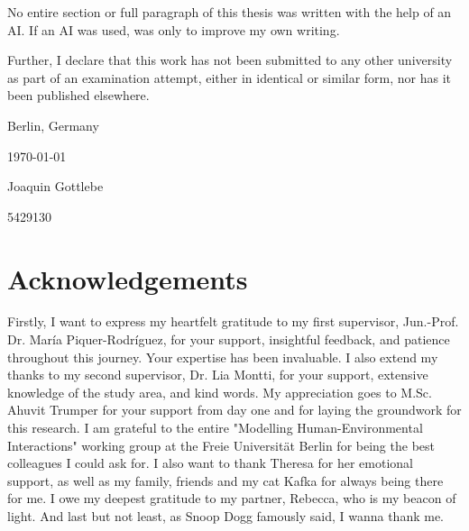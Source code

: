 \documentclass[11pt, a4paper]{report}
\begin{document}
No entire section or full paragraph of this thesis was written with the help of an AI. If an AI was used, was only to improve my own writing.

Further, I declare that this work has not been submitted to any other university as part of an examination attempt, either in identical or similar form, nor has it been published elsewhere.

\vfill

{
\centering

Berlin, Germany 

\today

\vspace{4em}

\underline{\hspace{6cm}}

Joaquin Gottlebe

5429130

}

\vfill

\chapter*{Acknowledgements}

Firstly, I want to express my heartfelt gratitude to my first supervisor, Jun.-Prof. Dr. María Piquer-Rodríguez, for your support, insightful feedback, and patience throughout this journey. Your expertise has been invaluable. I also extend my thanks to my second supervisor, Dr. Lia Montti, for your support, extensive knowledge of the study area, and kind words. My appreciation goes to M.Sc. Ahuvit Trumper for your support from day one and for laying the groundwork for this research. I am grateful to the entire "Modelling Human-Environmental Interactions" working group at the Freie Universität Berlin for being the best colleagues I could ask for. I also want to thank Theresa for her emotional support, as well as my family, friends and my cat Kafka for always being there for me. I owe my deepest gratitude to my partner, Rebecca, who is my  beacon of light. And last but not least, as Snoop Dogg famously said, I wanna thank me.

\tableofcontents
\newpage
\listoffigures
\newpage
\listoftables
\newpage
\end{document}
